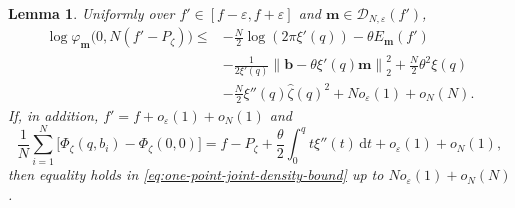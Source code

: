 \documentclass[a4paper,10pt,reqno]{amsart}
\numberwithin{equation}{section}
\newtheorem{lemma}[proposition]{Lemma}%
\newcommand{\ve}{\varepsilon}
\newcommand{\dd}{\mathrm{d}}
\newcommand{\bfm}{\mathbf{m}}
\newcommand{\bfb}{\mathbf{b}}
\begin{document}
	\begin{lemma}
		\label{lem:one-point-joint-density}
		Uniformly over \(f'\in[f-\ve,f+\ve]\) and
		\(\bfm\in\mathcal D_{N,\ve}(f')\),
		\begin{equation}\label{eq:one-point-joint-density-bound}
			\begin{aligned}
				\log \varphi_\bfm\bigl(0,N(f'-P_\zeta)\bigr)
				\le{}&
				-\frac N2\log(2\pi \xi'(q))
				-\theta E_\bfm(f')\\
				&-\frac1{2\xi'(q)}
				\left\|\bfb-\theta\xi'(q)\bfm\right\|_2^2
				+\frac N2\theta^2\xi(q)\\
				&-\frac N2\xi''(q)\widehat\zeta(q)^2
				+N o_\ve(1)+o_N(N).
			\end{aligned}
		\end{equation}
		If, in addition, \(f'=f+o_\ve(1)+o_N(1)\) and
		\begin{equation}\label{eq:ward2}
			\frac1N\sum_{i=1}^N
			\bigl[\Phi_\zeta(q,b_i)-\Phi_\zeta(0,0)\bigr]
			=
			f-P_\zeta
			+\frac\theta2\int_0^q t\xi''(t)\,\dd t
			+o_\ve(1)+o_N(1),
		\end{equation}
		then equality holds in
		\eqref{eq:one-point-joint-density-bound} up to
		\(N o_\ve(1)+o_N(N)\).
	\end{lemma}
	
\end{document}

